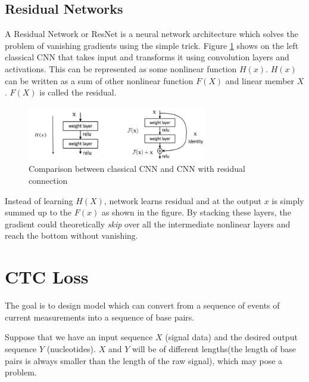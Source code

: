 \documentclass[times, utf8, diplomski, numeric, english]{fer}
\begin{document}
\subsection{Residual Networks}
A Residual Network or ResNet is a neural network architecture which solves the problem of vanishing gradients using the simple trick.  
Figure \ref{fg:resnet_block}  shows on the left classical CNN that takes input and transforms it using convolution layers and activations.  This can be represented as some nonlinear function $ H(x) $. $ H(x) $ can be written as a sum of other nonlinear function $F(X)$ and linear member $X$. $  F(X) $ is called the residual.

\begin{figure}[!ht]
	\begin{center}
		\includegraphics[width=0.7\textwidth]{./imgs/resnet_block.png}
		\caption[Comparison between classical CNN and CNN with residual connection ]{Comparison between classical CNN and CNN with residual connection \protect\footnotemark}
		\label{fg:resnet_block}
	\end{center}
\end{figure}
Instead of learning $H(X)$, network learns residual and at the output $x$ is simply summed up to the $F(x)$ as shown in the figure.  By stacking these layers, the gradient could theoretically \textit{skip} over all the intermediate nonlinear layers and reach the bottom without vanishing.




\section{CTC Loss}

The goal is to design model which can convert from a sequence of events of current measurements into a sequence of base pairs.

Suppose that we have an input sequence $X$ (signal data) and the desired output sequence $Y$ (nucleotides). $X$ and $Y$ will be of different lengths(the length of base pairs is always smaller than the length of the raw signal), which may pose a problem.
\end{document}

